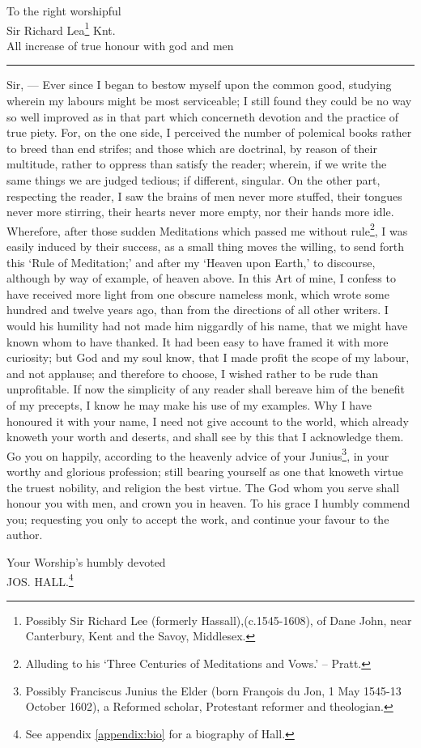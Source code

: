 \begin{center}
    To the right worshipful\\Sir Richard Lea\footnote{Possibly Sir Richard Lee (formerly Hassall),(c.1545-1608), of Dane John, near Canterbury, Kent and the Savoy, Middlesex.\cite{thrush2010}} Knt.\\All increase of true honour with god and men
\end{center}
    \vspace{5pt}
    \hrule
    \vspace{6pt}
    Sir, --- Ever since I began to bestow myself upon the common good, studying wherein my labours might be most serviceable; I still found they could be no way so well improved as in that part which concerneth devotion and the practice of true piety. For, on the one side, I perceived the number of polemical books rather to breed than end strifes; and those which are doctrinal, by reason of their multitude, rather to oppress than satisfy the reader; wherein, if we write the same things we are judged tedious; if different, singular. On the other part, respecting the reader, I saw the brains of men never more stuffed, their tongues never more stirring, their hearts never more empty, nor their hands more idle. Wherefore, after those sudden Meditations which passed me without rule\footnote{Alluding to his `Three Centuries of Meditations and Vows.' -- Pratt.}, I was easily induced by their success, as a small thing moves the willing, to send forth this `Rule of Meditation;' and after my `Heaven upon Earth,'\cite{hall1606a} to discourse, although by way of example, of heaven above. In this Art of mine, I confess to have received more light from one obscure nameless monk, which wrote some hundred and twelve years ago, than from the directions of all other writers. I would his humility had not made him niggardly of his name, that we might have known whom to have thanked. It had been easy to have framed it with more curiosity; but God and my soul know, that I made profit the scope of my labour, and not applause; and therefore to choose, I wished rather to be rude than unprofitable. If now the simplicity of any reader shall bereave him of the benefit of my precepts, I know he may make his use of my examples. Why I have honoured it with your name, I need not give account to the world, which already knoweth your worth and deserts, and shall see by this that I acknowledge them. Go you on happily, according to the heavenly advice of your Junius\footnote{Possibly Franciscus Junius the Elder (born Fran\c{c}ois du Jon, 1 May 1545-13 October 1602), a Reformed scholar, Protestant reformer and theologian.\cite{brit1911}}, in your worthy and glorious profession; still bearing yourself as one that knoweth virtue the truest nobility, and religion the best virtue. The God whom you serve shall honour you with men, and crown you in heaven. To his grace I humbly commend you; requesting you only to accept the work, and continue your favour to the author. 
    \begin{flushright}
    Your Worship's humbly devoted\\\uppercase{Jos. Hall.}\footnote{See appendix \ref{appendix:bio} for a biography of Hall.}
    \end{flushright}    
    